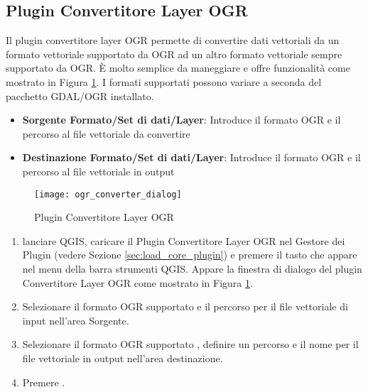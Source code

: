 
\subsection{Plugin Convertitore Layer OGR}


Il plugin convertitore layer OGR permette di convertire dati vettoriali da un formato vettoriale supportato da OGR ad un altro formato vettoriale sempre supportato da OGR. È molto semplice da maneggiare e offre funzionalità come mostrato in Figura \ref{fig:ogrconverter_dialog}. I formati supportati possono variare a seconda del pacchetto GDAL/OGR installato.


\begin{itemize}
\item \textbf{Sorgente Formato/Set di dati/Layer}: Introduce il formato OGR e il percorso al file vettoriale da convertire
\item \textbf{Destinazione Formato/Set di dati/Layer}: Introduce il formato OGR e il percorso al file vettoriale in output
\end{itemize}

\begin{figure}[ht]
   \begin{center}
   \caption{Plugin Convertitore Layer OGR \nixcaption}\label{fig:ogrconverter_dialog}\smallskip
   \texttt{[image: ogr\_converter\_dialog]}
\end{center}  
\end{figure}

\begin{enumerate}
  \item lanciare QGIS, caricare il Plugin Convertitore Layer OGR nel Gestore dei Plugin (vedere Sezione 
  \ref{sec:load_core_plugin}) e premere il tasto  che appare nel menu della barra strumenti QGIS. Appare la finestra di dialogo del plugin Convertitore Layer OGR come mostrato in Figura \ref{fig:ogrconverter_dialog}.
  \item Selezionare il formato OGR supportato  e il percorso per il file vettoriale di input  nell'area Sorgente.
  \item Selezionare il formato OGR supportato , definire un percorso e il nome per il file vettoriale in output  nell'area destinazione.
  \item Premere .
\end{enumerate}

\newpage
